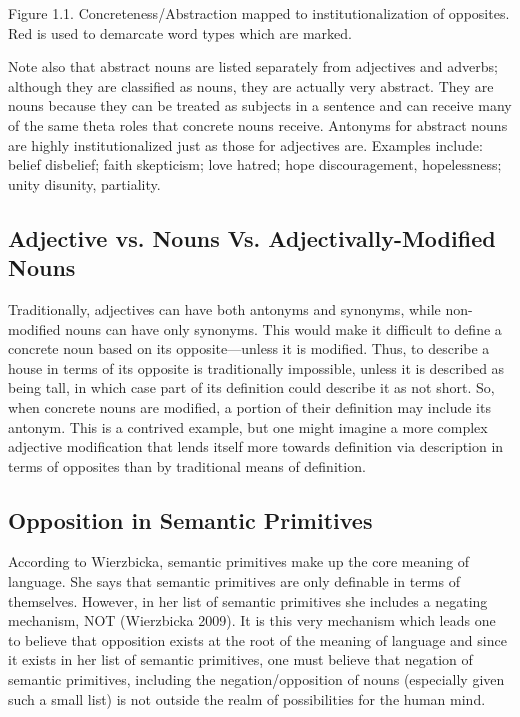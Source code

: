 Figure 1.1. Concreteness/Abstraction mapped to institutionalization of opposites.  Red is used to demarcate word types which are marked.

Note also that abstract nouns are listed separately from adjectives and adverbs; although they are classified as nouns, they are actually very abstract.  They are nouns because they can be treated as subjects in a sentence and can receive many of the same theta roles that concrete nouns receive.  
Antonyms for abstract nouns are highly institutionalized just as those for adjectives are.  Examples include: belief \opp disbelief; faith \opp skepticism; love \opp hatred; hope \opp discouragement, hopelessness; unity \opp disunity, partiality.

\subsection {Adjective vs. Nouns Vs. Adjectivally-Modified Nouns}  Traditionally, adjectives can have both antonyms and synonyms, while non-modified nouns can have only synonyms.  This would make it difficult to define a concrete noun based on its opposite—unless it is modified.  Thus, to describe a house in terms of its opposite is traditionally impossible, unless it is described as being tall, in which case part of its definition could describe it as not short.  So, when concrete nouns are modified, a portion of their definition may include its antonym.  This is a contrived example, but one might imagine a more complex adjective modification that lends itself more towards definition via description in terms of opposites than by traditional means of definition.  

\subsection {Opposition in Semantic Primitives} According to Wierzbicka, semantic primitives make up the core meaning of language.  She says that semantic primitives are only definable in terms of themselves.  However, in her list of semantic primitives she includes a negating mechanism, NOT (Wierzbicka 2009).  It is this very mechanism which leads one to believe that opposition exists at the root of the meaning of language and since it exists in her list of semantic primitives, one must believe that negation of semantic primitives, including the negation/opposition of nouns (especially given such a small list) is not outside the realm of possibilities for the human mind. 
